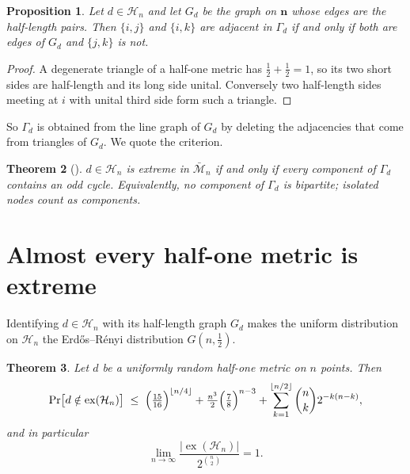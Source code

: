 \documentclass[11pt]{article}
\newtheorem{theorem}{Theorem}[section]
\newtheorem{proposition}[theorem]{Proposition}
\theoremstyle{definition}
\theoremstyle{remark}
\newcommand{\bM}{\bar{\mathcal{M}}}
\newcommand{\Ha}{\mathcal{H}}
\newcommand{\ex}{\operatorname{ex}}
\begin{document}
\begin{proposition}\label{prop:halfonegamma}
Let $d\in\Ha_n$ and let $G_d$ be the graph on $\mathbf n$ whose edges are the half-length
pairs. Then $\{i,j\}$ and $\{i,k\}$ are adjacent in $\Gamma_d$ if and only if both are
edges of $G_d$ and $\{j,k\}$ is not.
\end{proposition}

\begin{proof}
A degenerate triangle of a half-one metric has $\tfrac12+\tfrac12=1$, so its two short
sides are half-length and its long side unital. Conversely two half-length sides meeting at
$i$ with unital third side form such a triangle.
\end{proof}

So $\Gamma_d$ is obtained from the line graph of $G_d$ by deleting the adjacencies that
come from triangles of $G_d$. We quote the criterion.

\begin{theorem}[\cite{FK-cone}]\label{thm:criterion}
$d\in\Ha_n$ is extreme in $\bM_n$ if and only if every component of $\Gamma_d$ contains an
odd cycle. Equivalently, no component of $\Gamma_d$ is bipartite; isolated nodes count as
components.
\end{theorem}

\section{Almost every half-one metric is extreme}
\label{sec:density}

Identifying $d\in\Ha_n$ with its half-length graph $G_d$ makes the uniform distribution on
$\Ha_n$ the Erd\H{o}s--R\'enyi distribution $G(n,\tfrac12)$.

\begin{theorem}\label{thm:density}
Let $d$ be a uniformly random half-one metric on $n$ points. Then
\[
\Pr\bigl[d\notin\ex(\Ha_n)\bigr]\;\leq\;
\Bigl(\tfrac{15}{16}\Bigr)^{\lfloor n/4\rfloor}
+\tfrac{n^3}{2}\Bigl(\tfrac78\Bigr)^{n-3}
+\sum_{k=1}^{\lfloor n/2\rfloor}\binom nk 2^{-k(n-k)} ,
\]
and in particular
\[
\lim_{n\to\infty}\frac{|\ex(\Ha_n)|}{2^{\binom n2}}=1 .
\]
\end{theorem}
\end{document}
